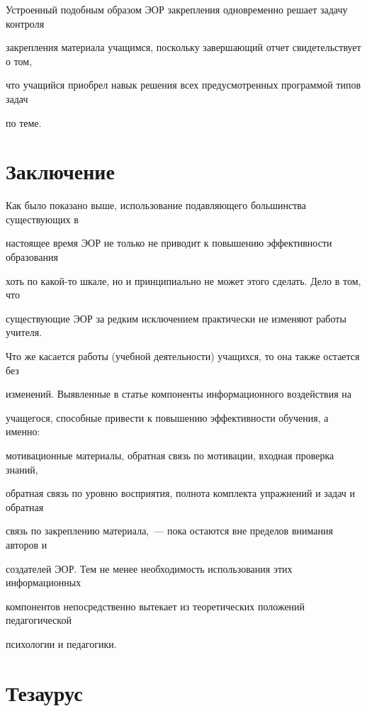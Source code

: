 Устроенный подобным образом ЭОР закрепления одновременно решает задачу контроля 


закрепления материала учащимся, поскольку завершающий отчет свидетельствует о том, 


что учащийся приобрел навык решения всех преду\-смот\-рен\-ных программой типов задач 


по теме.





\section{Заключение}





Как было показано выше, использование подавляющего большинства существующих в 


настоящее время ЭОР не только не приводит к повышению эффективности образования 


хоть по ка\-кой-то шкале, но и принципиально не может этого сделать. Дело в том, что 


существующие ЭОР за редким исключением практически не изменяют работы учителя. 


Что же касается работы (учебной деятельности) учащихся, то она также остается без 


изменений. Выявленные в статье компоненты информационного воздействия на 


учащегося, способные привести к повышению эффективности обучения, а именно: 


мотивационные материалы, обратная связь по мотивации, входная проверка знаний, 


обратная связь по уровню восприятия, полнота комплекта упражнений и задач и обратная 


связь по закреплению материала,~--- пока остаются вне пределов внимания авторов и 


создателей ЭОР. Тем не менее необходимость использования этих информационных 


компонентов непосредственно вытекает из теоретических положений педагогической 


психологии и педагогики.





\section{Тезаурус}





